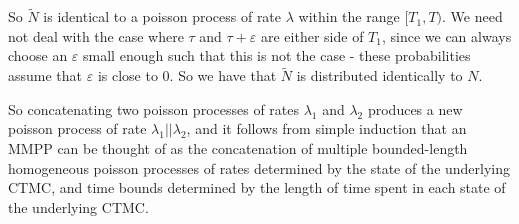 So $\widetilde{N}$ is identical to a poisson process of rate $\lambda$ within the range $[T_1,T)$. We need not deal with the case where $\tau$ and $\tau+\varepsilon$ are either side of $T_1$, since we can always choose an $\varepsilon$ small enough such that this is not the case - these probabilities assume that $\varepsilon$ is close to 0. So we have that $\widetilde{N}$ is distributed identically to $N$.

So concatenating two poisson processes of rates $\lambda_1$ and $\lambda_2$ produces a new poisson process of rate $\lambda_1||\lambda_2$, and it follows from simple induction that an MMPP can be thought of as the concatenation of multiple bounded-length homogeneous poisson processes of rates determined by the state of the underlying CTMC, and time bounds determined by the length of time spent in each state of the underlying CTMC.
